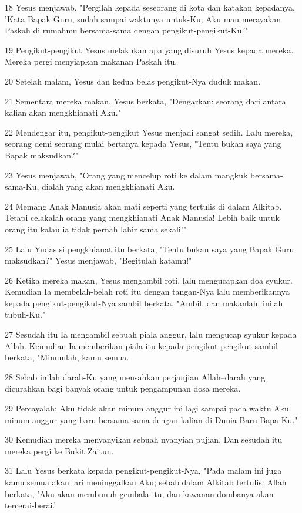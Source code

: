 \par 18 Yesus menjawab, "Pergilah kepada seseorang di kota dan katakan kepadanya, 'Kata Bapak Guru, sudah sampai waktunya untuk-Ku; Aku mau merayakan Paskah di rumahmu bersama-sama dengan pengikut-pengikut-Ku.'"
\par 19 Pengikut-pengikut Yesus melakukan apa yang disuruh Yesus kepada mereka. Mereka pergi menyiapkan makanan Paskah itu.
\par 20 Setelah malam, Yesus dan kedua belas pengikut-Nya duduk makan.
\par 21 Sementara mereka makan, Yesus berkata, "Dengarkan: seorang dari antara kalian akan mengkhianati Aku."
\par 22 Mendengar itu, pengikut-pengikut Yesus menjadi sangat sedih. Lalu mereka, seorang demi seorang mulai bertanya kepada Yesus, "Tentu bukan saya yang Bapak maksudkan?"
\par 23 Yesus menjawab, "Orang yang mencelup roti ke dalam mangkuk bersama-sama-Ku, dialah yang akan mengkhianati Aku.
\par 24 Memang Anak Manusia akan mati seperti yang tertulis di dalam Alkitab. Tetapi celakalah orang yang mengkhianati Anak Manusia! Lebih baik untuk orang itu kalau ia tidak pernah lahir sama sekali!"
\par 25 Lalu Yudas si pengkhianat itu berkata, "Tentu bukan saya yang Bapak Guru maksudkan?" Yesus menjawab, "Begitulah katamu!"
\par 26 Ketika mereka makan, Yesus mengambil roti, lalu mengucapkan doa syukur. Kemudian Ia membelah-belah roti itu dengan tangan-Nya lalu memberikannya kepada pengikut-pengikut-Nya sambil berkata, "Ambil, dan makanlah; inilah tubuh-Ku."
\par 27 Sesudah itu Ia mengambil sebuah piala anggur, lalu mengucap syukur kepada Allah. Kemudian Ia memberikan piala itu kepada pengikut-pengikut-sambil berkata, "Minumlah, kamu semua.
\par 28 Sebab inilah darah-Ku yang mensahkan perjanjian Allah--darah yang dicurahkan bagi banyak orang untuk pengampunan dosa mereka.
\par 29 Percayalah: Aku tidak akan minum anggur ini lagi sampai pada waktu Aku minum anggur yang baru bersama-sama dengan kalian di Dunia Baru Bapa-Ku."
\par 30 Kemudian mereka menyanyikan sebuah nyanyian pujian. Dan sesudah itu mereka pergi ke Bukit Zaitun.
\par 31 Lalu Yesus berkata kepada pengikut-pengikut-Nya, "Pada malam ini juga kamu semua akan lari meninggalkan Aku; sebab dalam Alkitab tertulis: Allah berkata, 'Aku akan membunuh gembala itu, dan kawanan dombanya akan tercerai-berai.'
